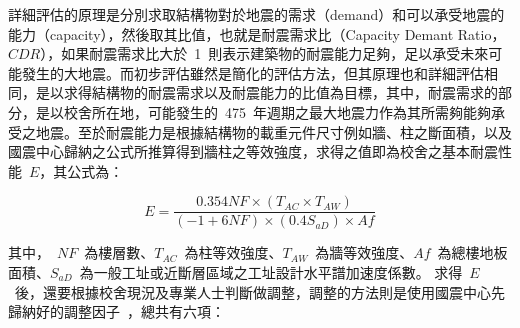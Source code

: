 詳細評估的原理是分別求取結構物對於地震的需求（demand）和可以承受地震的能力（capacity），然後取其比值，也就是耐震需求比（Capacity Demant Ratio，$CDR$），如果耐震需求比大於~1~則表示建築物的耐震能力足夠，足以承受未來可能發生的大地震。而初步評估雖然是簡化的評估方法，但其原理也和詳細評估相同，是以求得結構物的耐震需求以及耐震能力的比值為目標，其中，耐震需求的部分，是以校舍所在地，可能發生的~475~年週期之最大地震力作為其所需夠能夠承受之地震。至於耐震能力是根據結構物的載重元件尺寸例如牆、柱之斷面積，以及國震中心歸納之公式所推算得到牆柱之等效強度，求得之值即為校舍之基本耐震性能~$E$，其公式為：

  \begin{equation}E = \dfrac{ 0.354 NF \times (T_{AC} \times T_{AW}) }{(-1 + 6 NF) \times (0.4 S_{aD}) \times Af} \end{equation} 

其中，~$NF$~為樓層數、$T_{AC}$~為柱等效強度、$T_{AW}$~為牆等效強度、$Af$~為總樓地板面積、$S_{aD}$~為一般工址或近斷層區域之工址設計水平譜加速度係數。
求得~$E$~後，還要根據校舍現況及專業人士判斷做調整，調整的方法則是使用國震中心先歸納好的調整因子~\cite{ncree03049}，總共有六項：

